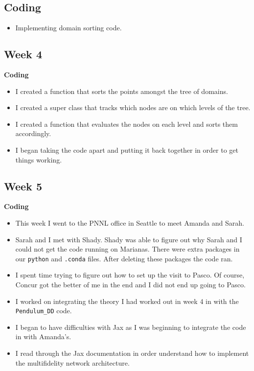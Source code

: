 \documentclass{article}
\def\bf{\textbf}
\begin{document}
\subsection*{Coding}
\begin{itemize}
\item Implementing domain sorting code.
\end{itemize}

\subsection*{Week 4}
\bf{Coding}
\begin{itemize}
\item I created a function that sorts the points amongst the tree of domains.
\item I created a super class that tracks which nodes are on which levels of the tree.
\item I created a function that evaluates the nodes on each level and sorts them accordingly.
\item I began taking the code apart and putting it back together in order to get things working.
\end{itemize}
\subsection*{Week 5} 
\bf{Coding}
\begin{itemize}
\item This week I went to the PNNL office in Seattle to meet  Amanda and Sarah.
\item Sarah and I met with Shady. Shady was able to figure out why Sarah and I could not get the code running on Marianas. There were extra packages in our \verb|python| and \verb|.conda| files. After deleting these packages the code ran.
\item I spent time trying to figure out how to set up the visit to Pasco. Of course, Concur got the better of me in the end and I did not end up going to Pasco.
\item I worked on integrating the theory I had worked out in week 4 in with the \verb|Pendulum_DD| code.
\item I began to have difficulties with Jax as I was beginning to integrate the code in with Amanda's.
\item I read through the Jax documentation in order understand how to implement the multifidelity network architecture.
\end{itemize}
\end{document}
